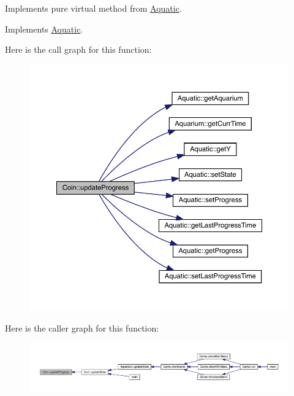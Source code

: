 Implements pure virtual method from \mbox{\hyperlink{class_aquatic}{Aquatic}}. 



Implements \mbox{\hyperlink{class_aquatic_ae1b6301ed27d6aadb73c7ee7879c24af}{Aquatic}}.

Here is the call graph for this function\+:\nopagebreak
\begin{figure}[H]
\begin{center}
\leavevmode
\includegraphics[width=350pt]{class_coin_ac54d7b690f7e415d2220711f718f638e_cgraph}
\end{center}
\end{figure}
Here is the caller graph for this function\+:
\nopagebreak
\begin{figure}[H]
\begin{center}
\leavevmode
\includegraphics[width=350pt]{class_coin_ac54d7b690f7e415d2220711f718f638e_icgraph}
\end{center}
\end{figure}
\mbox{\label{class_coin_ac9d03cbd68f9ccb739895832f77d60a3}} 

